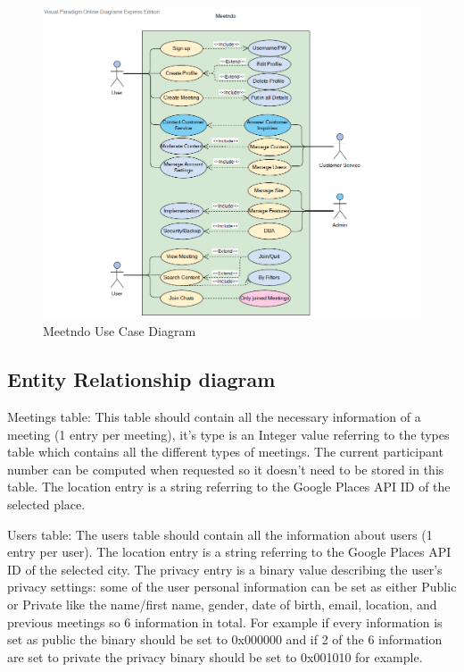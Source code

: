 \documentclass[conference]{IEEEtran}
\begin{document}
\clearpage
\begin{figure}[h!]
  \centering
  \includegraphics[scale=0.9]{pics/diagrams/use_cases.png}
  \caption { Meetndo Use Case Diagram}
\end{figure}


\subsection{Entity Relationship diagram}



Meetings table:
This table should contain all the necessary information of a meeting (1 entry per meeting), it’s type is an Integer value referring to the types table which contains all the different types of meetings. The current participant number can be computed when requested so it doesn’t need to be stored in this table. The location entry is a string referring to the Google Places API ID of the selected place.

Users table:
The users table should contain all the information about users (1 entry per user). The location entry is a string referring to the Google Places API ID of the selected city. The privacy entry is a binary value describing the user’s privacy settings: some of the user personal information can be set as either Public or Private like the name/first name, gender, date of birth, email, location, and previous meetings so 6 information in total. For example if every information is set as public the binary should be set to 0x000000 and if 2 of the 6 information are set to private the privacy binary should be set to 0x001010 for example.
\end{document}
